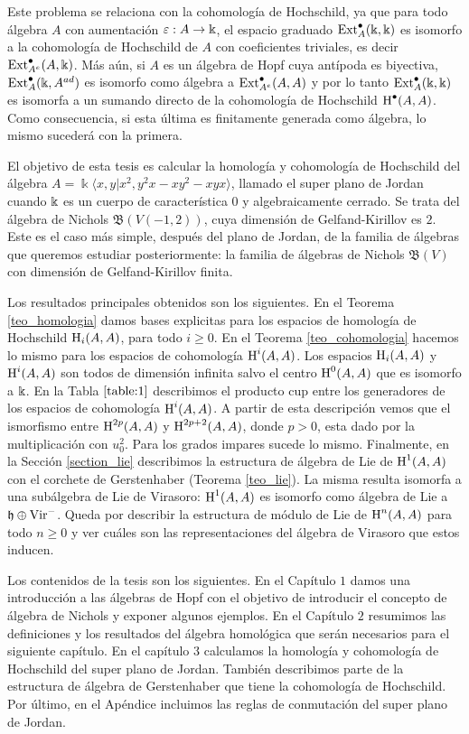 \documentclass[fleqn,../tesis.tex]{subfiles}
\begin{document}
Este problema se relaciona con la cohomología de Hochschild, ya que para todo álgebra $A$ con aumentación $\varepsilon:A \to \Bbbk$,
el espacio graduado
$\operatorname{Ext}_{A}^{\bullet}(\Bbbk, \Bbbk)$ es isomorfo a la cohomología de Hochschild de $A$ con coeficientes triviales,
es decir $\operatorname{Ext}_{A^{e}}^{\bullet}(A, \Bbbk)$. Más aún, si $A$ es un álgebra de Hopf cuya antípoda es biyectiva, $\operatorname{Ext}_{A}^{\bullet}(\Bbbk, A^{ad})$
es isomorfo como álgebra a $\operatorname{Ext}_{A^e}^{\bullet}(A, A)$ y por lo tanto $\operatorname{Ext}_A^{\bullet}(\Bbbk, \Bbbk)$ es isomorfa a un sumando directo
de la cohomología de Hochschild $\operatorname{H}^{\bullet}(A,A)$. Como consecuencia, si esta última es finitamente generada como álgebra, lo mismo
sucederá con la primera.

El objetivo de esta tesis es calcular la homología y cohomología de Hochschild del álgebra 
$A = \Bbbk\langle x, y | x^2, y^2x - xy^2 -xyx \rangle$, llamado el super plano de Jordan cuando $\Bbbk$
es un cuerpo de característica 0 y algebraicamente cerrado. Se trata del álgebra de Nichols $\mathfrak{B}(V(-1,2))$,
cuya dimensión de Gelfand-Kirillov es $2$. Este es el caso más simple, después del plano de Jordan, de la familia de álgebras 
que queremos estudiar posteriormente: la familia de álgebras de Nichols $\mathfrak{B}(V)$ con dimensión de Gelfand-Kirillov finita.

Los resultados principales obtenidos son los siguientes. En el Teorema \ref{teo_homologia} damos bases explicitas para los
espacios de homología de Hochschild $\operatorname{H}_{i}(A, A)$, para todo $i \geq 0$. En el Teorema \ref{teo_cohomologia} hacemos
lo mismo para los espacios de cohomología $\operatorname{H}^{i}(A, A)$. Los espacios $\operatorname{H}_{i}(A, A)$ y $\operatorname{H}^{i}(A, A)$ son todos de dimensión
infinita salvo el centro $\operatorname{H}^{0}(A,A)$ que es isomorfo a $\Bbbk$. En la Tabla $\ref{table:1}$ describimos el producto
cup entre los generadores de los espacios de cohomología $\operatorname{H}^{i}(A, A)$. A partir de esta descripción vemos que el ismorfismo
entre $\operatorname{H}^{2p}(A, A)$ y $\operatorname{H}^{2p + 2}(A, A)$, donde $p > 0$, esta dado por la multiplicación con $u_0^{2}$. Para los
grados impares sucede lo mismo. Finalmente, en la Sección \ref{section_lie} describimos la estructura de álgebra de Lie
de  $\operatorname{H}^{1}(A,A)$ con el corchete de Gerstenhaber (Teorema \ref{teo_lie}). La misma resulta isomorfa a una subálgebra
de Lie de Virasoro: $\operatorname{H}^{1}(A,A)$ es isomorfo como álgebra de Lie a $\mathfrak{h} \oplus \operatorname{Vir}^{-}$. Queda por
describir la estructura de módulo de Lie de $\operatorname{H}^{n}(A,A)$ para todo $n \geq 0$ y ver cuáles son las representaciones
del álgebra de Virasoro que estos inducen.

Los contenidos de la tesis son los siguientes. En el Capítulo $1$ damos una introducción a las álgebras de Hopf con
el objetivo de introducir el concepto de álgebra de Nichols y exponer algunos ejemplos. En el Capítulo $2$ resumimos
las definiciones y los resultados del álgebra homológica que serán necesarios para el siguiente capítulo. En el capítulo
$3$ calculamos la homología y cohomología de Hochschild del super plano de Jordan. También describimos
parte de la estructura de álgebra de Gerstenhaber que tiene la cohomología de Hochschild. Por último,
en el Apéndice incluimos las reglas de conmutación del super plano de Jordan.
\end{document}
